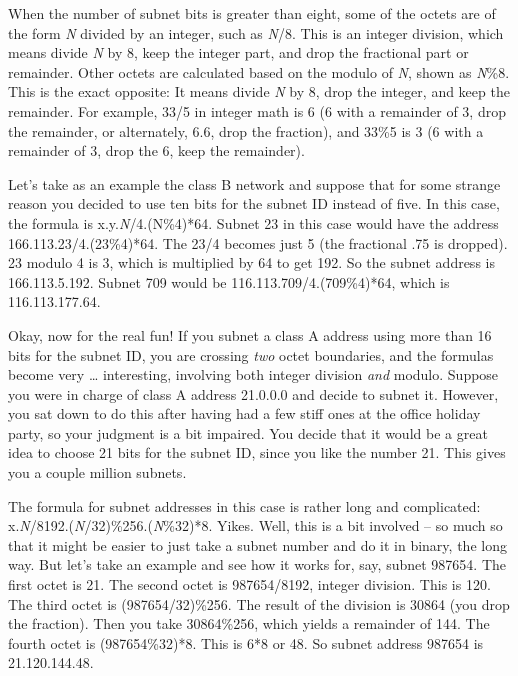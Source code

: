 When the number of subnet bits is greater than eight, some of the octets
are of the form {\emph{N}} divided by an integer, such as {\emph{N}}/8.
This is an integer division, which means divide {\emph{N}} by 8, keep
the integer part, and drop the fractional part or remainder. Other
octets are calculated based on the modulo of {\emph{N}}, shown as
{\emph{N}}\%8. This is the exact opposite: It means divide {\emph{N}} by
8, drop the integer, and keep the remainder. For example, 33/5 in
integer math is 6 (6 with a remainder of 3, drop the remainder, or
alternately, 6.6, drop the fraction), and 33\%5 is 3 (6 with a remainder
of 3, drop the 6, keep the remainder).

Let's take as an example the class B network and suppose that for some
strange reason you decided to use ten bits for the subnet ID instead of
five. In this case, the formula is x.y.{\emph{N}}/4.(N\%4)*64. Subnet 23
in this case would have the address 166.113.23/4.(23\%4)*64. The 23/4
becomes just 5 (the fractional .75 is dropped). 23 modulo 4 is 3, which
is multiplied by 64 to get 192. So the subnet address is 166.113.5.192.
Subnet 709 would be 116.113.709/4.(709\%4)*64, which is 116.113.177.64.

Okay, now for the real fun! If you subnet a class A address using more
than 16 bits for the subnet ID, you are crossing {\emph{two}} octet
boundaries, and the formulas become very \ldots{} interesting, involving
both integer division {\emph{and}} modulo. Suppose you were in charge of
class A address 21.0.0.0 and decide to subnet it. However, you sat down
to do this after having had a few stiff ones at the office holiday
party, so your judgment is a bit impaired. You decide that it would be a
great idea to choose 21 bits for the subnet ID, since you like the
number 21. This gives you a couple million subnets.

The formula for subnet addresses in this case is rather long and
complicated: x.{\emph{N}}/8192.({\emph{N}}/32)\%256.({\emph{N}}\%32)*8.
Yikes. Well, this is a bit involved -- so much so that it might be easier
to just take a subnet number and do it in binary, the long way. But
let's take an example and see how it works for, say, subnet 987654. The
first octet is 21. The second octet is 987654/8192, integer division.
This is 120. The third octet is (987654/32)\%256. The result of the
division is 30864 (you drop the fraction). Then you take 30864\%256,
which yields a remainder of 144. The fourth octet is (987654\%32)*8.
This is 6*8 or 48. So subnet address 987654 is 21.120.144.48.

